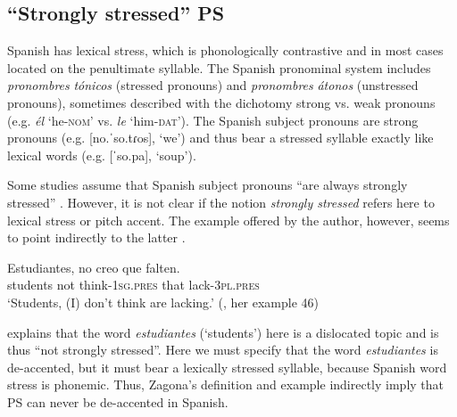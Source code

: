\documentclass[output=paper]{langsci/langscibook}
\begin{document}
\subsection{``Strongly stressed'' PS}
\label{sec:pes:2.1}
Spanish has lexical stress, which is phonologically contrastive and in most cases located on the penultimate syllable. The Spanish pronominal system includes \textit{pronombres} \textit{tónicos} (stressed pronouns) and \textit{pronombres} \textit{átonos} (unstressed pronouns), sometimes described with the dichotomy strong vs. weak pronouns (e.g. \textit{él} ‘he-\textsc{nom}’ vs. \textit{le} ‘him-\textsc{dat}’). The Spanish subject pronouns are strong pronouns (e.g. [no.ˈso.tɾos], ‘we’) and thus bear a stressed syllable exactly like lexical words (e.g. [ˈso.pa], ‘soup’).

Some studies assume that Spanish subject pronouns ``are always strongly \\ stressed'' \citep[25]{Zagona2002}. However, it is not clear if the notion \textit{strongly stressed} refers here to lexical stress or pitch accent. The example offered by the author, however, seems to point indirectly to the latter .


\ea\label{ex:pes:2}
\gll Estudiantes,   no   creo       que  falten.\\
       students    not  think-\textsc{1sg}.\textsc{pres} that   lack-\textsc{3pl}.\textsc{pres}\\
\glt ‘Students, (I) don’t think are lacking.’     (\citealt[22]{Zagona2002}, her example 46)
\z

\citet[22]{Zagona2002} explains that the word \textit{estudiantes} (‘students’) here is a dislocated topic and is thus ``not strongly stressed''. Here we must specify that the word \textit{estudiantes} is de-accented, but it must bear a lexically stressed syllable, because Spanish word stress is phonemic. Thus, Zagona’s definition and example indirectly imply that PS can never be de-accented in Spanish.
\end{document}
